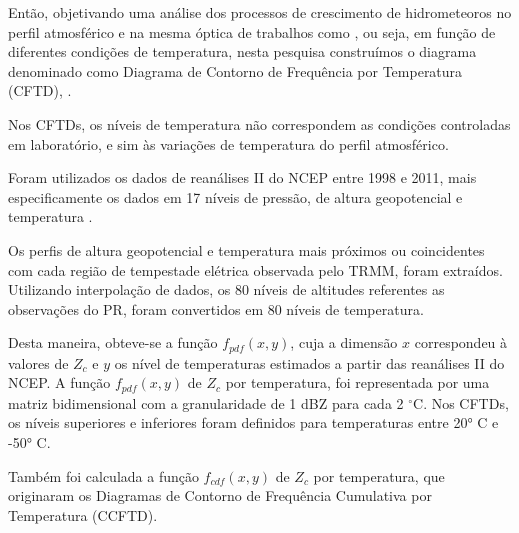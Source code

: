 Então, objetivando uma análise dos processos de crescimento de hidrometeoros no perfil atmosférico e na mesma óptica de trabalhos como , ou seja, em função de diferentes condições de temperatura, nesta pesquisa construímos o diagrama denominado como Diagrama de Contorno de Frequência por Temperatura (CFTD), .

Nos CFTDs, os níveis de temperatura não correspondem as condições controladas em laboratório, e sim às variações de temperatura do perfil atmosférico. 

Foram utilizados os dados de reanálises II do NCEP entre 1998 e 2011, mais especificamente os dados em 17 níveis de pressão, de altura geopotencial e temperatura \cite{kanamitsu}. 

Os perfis de altura geopotencial e temperatura mais próximos ou coincidentes com cada região de tempestade elétrica observada pelo TRMM, foram extraídos. Utilizando interpolação de dados, os 80 níveis de altitudes referentes as observações do PR, foram convertidos em 80 níveis de temperatura.

Desta maneira, obteve-se a função $f_{pdf}(x,y)$, cuja a dimensão $x$ correspondeu à valores de $Z_{c}$ e $y$ os nível de temperaturas estimados a partir das reanálises II do NCEP. A função $f_{pdf}(x,y)$ de $Z_c$ por temperatura, foi representada por uma matriz bidimensional com a granularidade de 1 dBZ para cada 2 $^{\circ}$C. Nos CFTDs, os níveis superiores e inferiores foram definidos para temperaturas entre 20° C e -50° C.


Também foi calculada a função $f_{cdf}(x,y)$ de $Z_c$ por temperatura, que originaram os Diagramas de Contorno de Frequência Cumulativa por Temperatura (CCFTD).     







